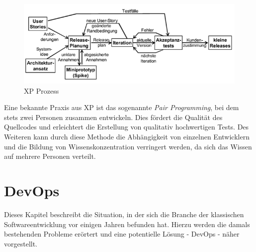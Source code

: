 \begin{figure}
  \centering
  \includegraphics[width=\textwidth]{img/xpmodell.png}
  \caption{XP Prozess \parencite[][S. 46]{Schatten:2010aa}}
  \label{fig:xpmodell}
\end{figure}

Eine bekannte Praxis aus XP ist das sogenannte \emph{Pair Programming}, bei dem stets zwei Personen zusammen entwickeln.
Dies fördert die Qualität des Quellcodes und erleichtert die Erstellung von qualitativ hochwertigen Tests.
Des Weiteren kann durch diese Methode die Abhängigkeit von einzelnen Entwicklern und die Bildung von Wissenskonzentration verringert werden, da sich das Wissen auf mehrere Personen verteilt.

\section{DevOps} %
Dieses Kapitel beschreibt die Situation, in der sich die Branche der klassischen Softwareentwicklung vor einigen Jahren befunden hat. Hierzu werden die damals bestehenden Probleme erörtert und eine potentielle Lösung - DevOps - näher vorgestellt.

